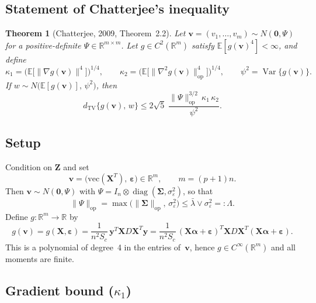 \documentclass[11pt]{article}
\newcommand{\R}{\mathbb{R}}
\newcommand{\E}{\mathbb{E}}
\newcommand{\Var}{\operatorname{Var}}
\newcommand{\diag}{\operatorname{diag}}
\newcommand{\dTV}{d_{\mathrm{TV}}}
\newcommand{\op}{\mathrm{op}}
\newcommand{\X}{\bm{X}}
\newcommand{\Z}{\bm{Z}}
\newcommand{\y}{\bm{y}}
\newcommand{\bSig}{\bm{\Sigma}}
\newcommand{\bal}{\bm{\alpha}}
\newcommand{\beps}{\bm{\varepsilon}}
\newcommand{\bv}{\bm{v}}
\newtheorem{theorem}{Theorem}
\begin{document}
\subsection{Statement of Chatterjee's inequality}

\begin{theorem}[Chatterjee, 2009, Theorem~2.2]\label{thm:chatterjee}
Let $\bv=(v_1,\dots,v_m)\sim N(\bm{0},\Psi)$ for a positive-definite
$\Psi\in\R^{m\times m}$.  Let $g\in C^{2}(\R^m)$ satisfy
$\E[g(\bv)^{4}]<\infty$, and define
\begin{equation}\label{eq:kappas}
  \kappa_1 = \bigl(\E\bigl[\|\nabla g(\bv)\|^{4}\bigr]\bigr)^{1/4},
  \qquad
  \kappa_2 = \bigl(\E\bigl[\|\nabla^{2}g(\bv)\|_{\op}^{4}\bigr]\bigr)^{1/4},
  \qquad
  \psi^{2} = \Var\{g(\bv)\}.
\end{equation}
If $w\sim N\bigl(\E[g(\bv)],\,\psi^{2}\bigr)$, then
\begin{equation}\label{eq:chatterjee_bound}
  \dTV\bigl\{g(\bv),\,w\bigr\}
  \le 2\sqrt{5}\;\frac{\|\Psi\|_{\op}^{3/2}\,\kappa_1\,\kappa_2}{\psi^{2}}.
\end{equation}
\end{theorem}

\subsection{Setup}\label{ssec:setup_chatterjee}

Condition on $\Z$ and set
\begin{equation}\label{eq:vdef}
  \bv = \bigl(\mathrm{vec}(\X^{T}),\,\beps\bigr)\in\R^{m},
  \qquad m=(p+1)n.
\end{equation}
Then $\bv\sim N(\bm{0},\Psi)$ with
$\Psi=I_n\otimes\diag(\bSig,\sigma_\varepsilon^{2})$, so that
\begin{equation}\label{eq:Psi_op}
  \|\Psi\|_{\op}
  = \max\bigl(\|\bSig\|_{\op},\,\sigma_\varepsilon^{2}\bigr)
  \le \bar\lambda\vee\sigma_\varepsilon^{2}
  =: \Lambda.
\end{equation}
Define $g:\R^{m}\to\R$ by
\begin{equation}\label{eq:gdef}
  g(\bv)
  = g(\X,\beps)
  = \frac{1}{n^{2}S_c}\,\y^{T}\X D\X^{T}\y
  = \frac{1}{n^{2}S_c}\,(\X\bal+\beps)^{T}\X D\X^{T}(\X\bal+\beps).
\end{equation}
This is a polynomial of degree~4 in the entries of~$\bv$, hence
$g\in C^{\infty}(\R^m)$ and all moments are finite.

\subsection{Gradient bound ($\kappa_1$)}\label{ssec:kappa1}
\end{document}
